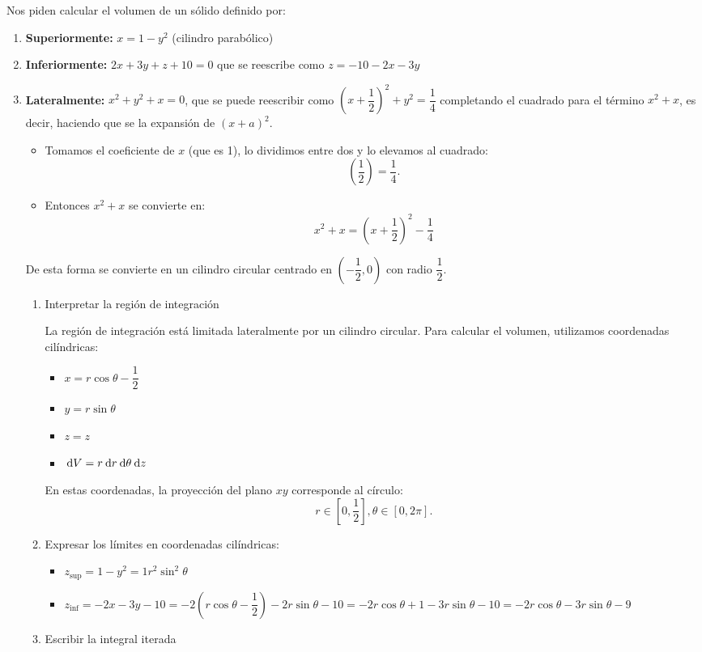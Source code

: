 \begin{enumerate}[label=\color{red}\textbf{\arabic*)}, leftmargin=*]
  Nos piden calcular el volumen de un sólido definido por:
  \begin{enumerate}[label=\arabic*)]
    \item \textbf{Superiormente:} $x=1-y^2$ (cilindro parabólico)
    \item \textbf{Inferiormente:} $2x+3y+z+10=0$ que se reescribe como  $z=-10-2x-3y$
    \item \textbf{Lateralmente:} $x^2+y^2+x=0$, que se puede reescribir como $\left( x+\dfrac{1}{2} \right) ^2+y^2=\dfrac{1}{4}$ completando el cuadrado para el término $x^2+x$, es decir, haciendo que se la expansión de $(x+a)^2$. 
      \begin{itemize}[label=\textbullet]
        \item Tomamos el coeficiente de $x$ (que es 1), lo dividimos entre dos y lo elevamos al cuadrado:  \[
        \left( \dfrac{1}{2} \right) =\dfrac{1}{4}.
        \] 
      \item Entonces $x^2+x$ se convierte en: \[
      x^2+x=\left( x+\dfrac{1}{2} \right) ^2-\dfrac{1}{4}
      \] 
      \end{itemize}
    De esta forma se convierte en un cilindro circular centrado en $\left( -\dfrac{1}{2},0 \right) $ con radio $\dfrac{1}{2}$.
    \begin{enumerate}[label=Paso \arabic*:]
      \item Interpretar la región de integración

        La región de integración está limitada lateralmente por un cilindro circular. Para calcular el volumen, utilizamos coordenadas cilíndricas:
        \begin{itemize}[label=\textbullet, leftmargin=*]
          \item $x=r\cos\theta-\dfrac{1}{2}$
          \item $y=r\sin\theta$
          \item $z=z$
          \item  $\:\mathrm{d}V=r\:\mathrm{d}r \:\mathrm{d}\theta \:\mathrm{d}z $
        \end{itemize}
        En estas coordenadas, la proyección del plano $xy$ corresponde al círculo:  \[
          r\in \left[ 0, \dfrac{1}{2} \right], \theta\in [0,2\pi].
        \] 
      \item Expresar los límites en coordenadas cilíndricas:
        \begin{itemize}[label=\textbullet, leftmargin=*]
          \item $z_{\mathrm{sup}}=1-y^2=1r^2\sin^2\theta$ 
          \item $z_{\mathrm{inf}}=-2x-3y-10=-2\left( r\cos\theta-\dfrac{1}{2} \right)-2r\sin\theta-10=-2r\cos\theta+1-3r\sin\theta -10=-2r\cos\theta-3r\sin\theta-9$
        \end{itemize}
      \item Escribir la integral iterada


\end{enumerate}
\end{enumerate}
\end{enumerate}
